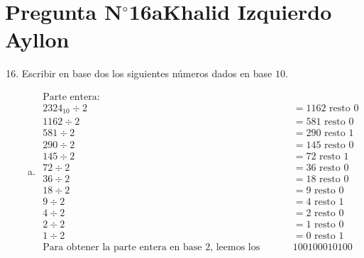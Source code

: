 \section{Pregunta N$^{\circ}$16a\qquad Khalid Izquierdo Ayllon}

\begin{frame}
	\begin{enumerate}\setcounter{enumi}{15}
		\item

		      Escribir en base dos los siguientes números dados en base $10$.


		      \begin{enumerate}[a)]
			      \item
                    
                    \begin{center}
                    \begin{align*}
                        \text{Parte entera: } & \\
                        2324_{10} \div 2 &= 1162 \text{ resto } 0 \\
                        1162 \div 2 &= 581 \text{ resto } 0 \\
                        581 \div 2 &= 290 \text{ resto } 1 \\
                        290 \div 2 &= 145 \text{ resto } 0 \\
                        145 \div 2 &= 72 \text{ resto } 1 \\
                        72 \div 2 &= 36 \text{ resto } 0 \\
                        36 \div 2 &= 18 \text{ resto } 0 \\
                        18 \div 2 &= 9 \text{ resto } 0 \\
                        9 \div 2 &= 4 \text{ resto } 1 \\
                        4 \div 2 &= 2 \text{ resto } 0 \\
                        2 \div 2 &= 1 \text{ resto } 0 \\
                        1 \div 2 &= 0 \text{ resto } 1 \\
                        \text{Para obtener la parte entera en base 2, leemos los restos de abajo hacia arriba: } & 100100010100
                    \end{align*}
                    \end{center}
                    
                \end{enumerate}
        \end{enumerate}
\end{frame}


